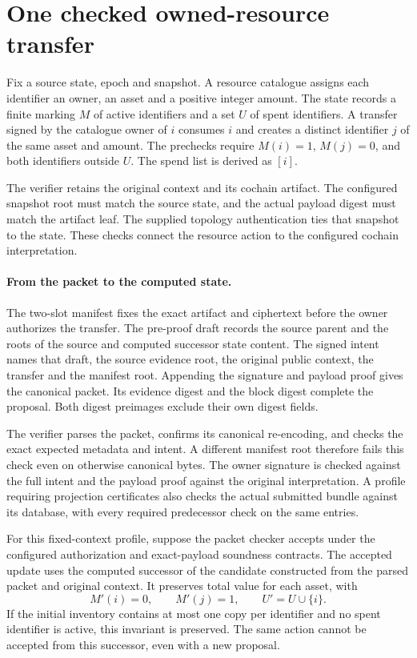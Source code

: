 \section{One checked owned-resource transfer}\label{sec:checked-owned-transfer}

Fix a source state, epoch and snapshot. A resource catalogue assigns each
identifier an owner, an asset and a positive integer amount. The state
records a finite marking \(M\) of active identifiers and a set \(U\) of
spent identifiers. A transfer signed by the catalogue owner of \(i\)
consumes \(i\) and creates a distinct identifier \(j\) of the same asset
and amount. The prechecks require \(M(i)=1\), \(M(j)=0\), and both
identifiers outside \(U\). The spend list is derived as \([i]\).

The verifier retains the original context and its cochain artifact. The
configured snapshot root must match the source state, and the actual
payload digest must match the artifact leaf. The supplied topology
authentication ties that snapshot to the state. These checks connect the
resource action to the configured cochain interpretation.

\paragraph{From the packet to the computed state.}
The two-slot manifest fixes the exact artifact and ciphertext before the
owner authorizes the transfer. The pre-proof draft records the source
parent and the roots of the source and computed successor state content.
The signed intent names that draft, the source evidence root, the original
public context, the transfer and the manifest root. Appending the signature
and payload proof gives the canonical packet. Its evidence digest and the
block digest complete the proposal. Both digest preimages exclude their own
digest fields.

The verifier parses the packet, confirms its canonical re-encoding, and
checks the exact expected metadata and intent. A different manifest root
therefore fails this check even on otherwise canonical bytes. The owner
signature is checked against the full intent and the payload proof against
the original interpretation. A profile requiring projection certificates
also checks the actual submitted bundle against its database, with every
required predecessor check on the same entries.

\begin{proposition}
\label{prop:checked-owned-update}
For this fixed-context profile, suppose the packet checker accepts under
the configured authorization and exact-payload soundness contracts. The
accepted update uses the computed successor of the candidate constructed
from the parsed packet and original context. It preserves total value
for each asset, with
\[
  M'(i)=0,\qquad M'(j)=1,\qquad U'=U\cup\{i\}.
\]
If the initial inventory contains at most one copy per identifier and no
spent identifier is active, this invariant is preserved. The same action
cannot be accepted from this successor, even with a new proposal.
\end{proposition}

